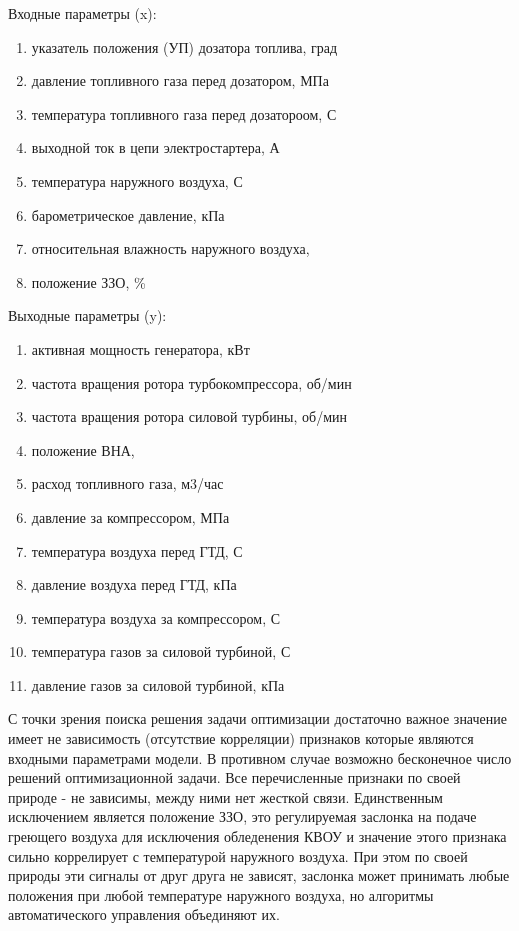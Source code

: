 \documentclass[12pt,a4paper]{article}
\begin{document}
\begin{description}
	\item Входные параметры (x):
	\begin{enumerate}
		\item указатель положения (УП) дозатора топлива, град
		\item давление топливного газа перед дозатором, МПа
		\item температура топливного газа перед дозатороом, \degree С
		\item выходной ток в цепи электростартера, А
		\item температура наружного воздуха, \degree С
		\item барометрическое давление, кПа
		\item относительная влажность наружного воздуха, %
		\item положение ЗЗО, \%

	\end{enumerate}
	\item Выходные параметры (y):
	\begin{enumerate}
		\item активная мощность генератора, кВт
		\item частота вращения ротора турбокомпрессора, об/мин
		\item частота вращения ротора силовой турбины, об/мин
		\item положение ВНА, \degree
		\item расход топливного газа, м3/час
		\item давление за компрессором, МПа
		\item температура воздуха перед ГТД, \degree С
		\item давление воздуха перед ГТД, кПа
		\item температура воздуха за компрессором, \degree С
		\item температура газов за силовой турбиной, \degree С
		\item давление газов за силовой турбиной, кПа
	\end{enumerate}
\end{description}

С точки зрения поиска решения задачи оптимизации достаточно важное значение имеет не зависимость (отсутствие корреляции) признаков которые являются входными параметрами модели. В противном случае возможно бесконечное число решений оптимизационной задачи. Все перечисленные признаки по своей природе - не зависимы, между ними нет жесткой связи. Единственным исключением является положение ЗЗО, это регулируемая заслонка на подаче греющего воздуха для исключения обледенения КВОУ и значение этого признака сильно коррелирует с температурой наружного воздуха. При этом по своей природы эти сигналы от друг друга не зависят, заслонка может принимать любые положения при любой температуре наружного воздуха, но алгоритмы автоматического управления объединяют их.
\end{document}
